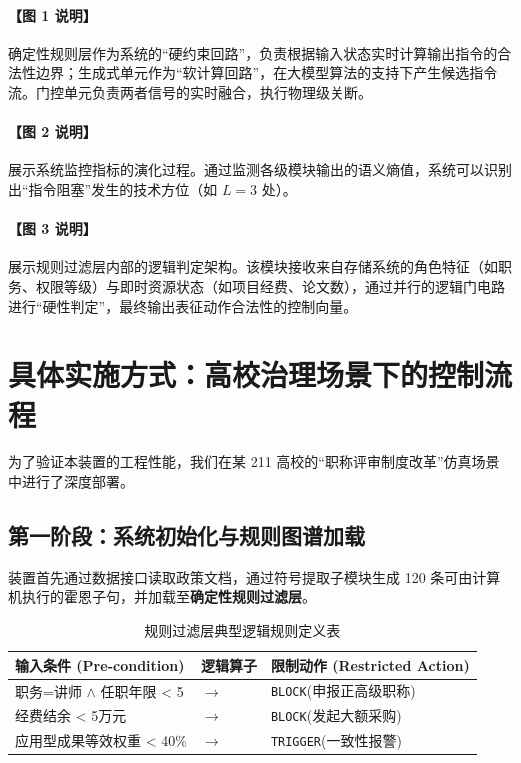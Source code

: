 \documentclass[UTF8, fontset=mac]{ctexart}
\begin{document}
\paragraph{【图 1 说明】}
确定性规则层作为系统的“硬约束回路”，负责根据输入状态实时计算输出指令的合法性边界；生成式单元作为“软计算回路”，在大模型算法的支持下产生候选指令流。门控单元负责两者信号的实时融合，执行物理级关断。

\paragraph{【图 2 说明】}
展示系统监控指标的演化过程。通过监测各级模块输出的语义熵值，系统可以识别出“指令阻塞”发生的技术方位（如 $L=3$ 处）。

\paragraph{【图 3 说明】}
展示规则过滤层内部的逻辑判定架构。该模块接收来自存储系统的角色特征（如职务、权限等级）与即时资源状态（如项目经费、论文数），通过并行的逻辑门电路进行“硬性判定”，最终输出表征动作合法性的控制向量。

\section{具体实施方式：高校治理场景下的控制流程}
为了验证本装置的工程性能，我们在某 211 高校的“职称评审制度改革”仿真场景中进行了深度部署。

\subsection{第一阶段：系统初始化与规则图谱加载}
装置首先通过数据接口读取政策文档，通过符号提取子模块生成 120 条可由计算机执行的霍恩子句，并加载至\textbf{确定性规则过滤层}。
\begin{table}[h]
    \centering
    \caption{规则过滤层典型逻辑规则定义表}
    \begin{tabular}{lll}
        \toprule
        \textbf{输入条件 (Pre-condition)} & \textbf{逻辑算子} & \textbf{限制动作 (Restricted Action)} \\
        \midrule
        职务=讲师 $\wedge$ 任职年限 < 5 & $\to$ & \texttt{BLOCK}(申报正高级职称) \\
        经费结余 < 5万元 & $\to$ & \texttt{BLOCK}(发起大额采购) \\
        应用型成果等效权重 < 40\% & $\to$ & \texttt{TRIGGER}(一致性报警) \\
        \bottomrule
    \end{tabular}
\end{table}
\end{document}
